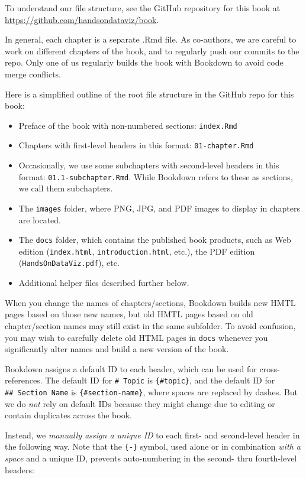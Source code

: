 \documentclass[
  english,
]{book}
\providecommand{\tightlist}{%
  \setlength{\itemsep}{0pt}\setlength{\parskip}{0pt}}
\begin{document}
To understand our file structure, see the GitHub repository for this book at \url{https://github.com/handsondataviz/book}.

In general, each chapter is a separate .Rmd file. As co-authors, we are careful to work on different chapters of the book, and to regularly push our commits to the repo. Only one of us regularly builds the book with Bookdown to avoid code merge conflicts.

Here is a simplified outline of the root file structure in the GitHub repo for this book:

\begin{itemize}
\tightlist
\item
  Preface of the book with non-numbered sections: \texttt{index.Rmd}
\item
  Chapters with first-level headers in this format: \texttt{01-chapter.Rmd}
\item
  Occasionally, we use some subchapters with second-level headers in this format: \texttt{01.1-subchapter.Rmd}. While Bookdown refers to these as sections, we call them subchapters.
\item
  The \texttt{images} folder, where PNG, JPG, and PDF images to display in chapters are located.
\item
  The \texttt{docs} folder, which contains the published book products, such as Web edition (\texttt{index.html}, \texttt{introduction.html}, etc.), the PDF edition (\texttt{HandsOnDataViz.pdf}), etc.
\item
  Additional helper files described further below.
\end{itemize}

When you change the names of chapters/sections, Bookdown builds new HMTL pages based on those new names, but old HMTL pages based on old chapter/section names may still exist in the same subfolder. To avoid confusion, you may wish to carefully delete old HTML pages in \texttt{docs} whenever you significantly alter names and build a new version of the book.

Bookdown assigns a default ID to each header, which can be used for cross-references. The default ID for \texttt{\#\ Topic} is \texttt{\{\#topic\}}, and the default ID for \texttt{\#\#\ Section\ Name} is \texttt{\{\#section-name\}}, where spaces are replaced by dashes. But we do \emph{not} rely on default IDs because they might change due to editing or contain duplicates across the book.

Instead, we \emph{manually assign a unique ID} to each first- and second-level header in the following way. Note that the \texttt{\{-\}} symbol, used alone or in combination \emph{with a space} and a unique ID, prevents auto-numbering in the second- thru fourth-level headers:
\end{document}

